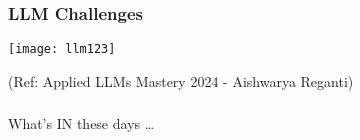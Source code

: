 



\begin{frame}[fragile]\frametitle{LLM Challenges}

\begin{center}
\texttt{[image: llm123]}
\end{center}				

{\tiny (Ref: Applied LLMs Mastery 2024 - Aishwarya Reganti)}

\end{frame}


\begin{frame}[fragile]\frametitle{}
\begin{center}
{\Large What's IN these days \ldots}
\end{center}

\end{frame}





    


